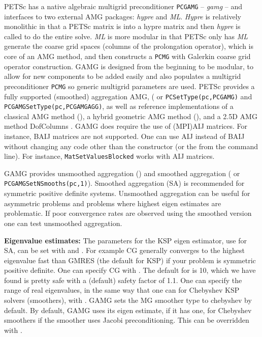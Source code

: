 PETSc has a native algebraic multigrid preconditioner \lstinline{PCGAMG} -- {\it gamg} -- and interfaces to two
external AMG packages: {\it hypre} and {\it ML}.
{\it Hypre}  is relatively monolithic in that a PETSc matrix is into a hypre matrix and then {\it hypre} is called to do the entire solve.
{\it ML} is more modular in that PETSc only has {\it ML} generate the coarse grid spaces (columns of the prolongation operator), which is core of an AMG method, and then constructs a \lstinline{PCMG} with Galerkin coarse grid operator construction.
GAMG is designed from the beginning to be modular, to allow for new components to be added easily and also populates a multigrid preconditioner \lstinline{PCMG} so generic multigrid parameters are used.
PETSc provides a fully supported (smoothed) aggregation AMG, ( or  \lstinline{PCSetType(pc,PCGAMG)} and \lstinline{PCGAMGSetType(pc,PCGAMGAGG)}, as well as reference implementations of a classical AMG method (), a hybrid geometric AMG method (), and a 2.5D AMG method DofColumns \cite{IsaacStadlerGhattas2015}.
GAMG does require the use of (MPI)AIJ matrices.
For instance, BAIJ matrices are not supported.
One can use AIJ instead of BAIJ without changing any code other than the constructor (or the  from the command line).
For instance, \lstinline{MatSetValuesBlocked} works with AIJ matrices.

GAMG provides unsmoothed aggregation () and smoothed aggregation ( or \lstinline{PCGAMGSetNSmooths(pc,1)}).
Smoothed aggregation (SA) is recommended for symmetric positive
definite systems.
Unsmoothed aggregation can be useful for asymmetric
problems and problems where highest eigen estimates are problematic.
If poor convergence rates are observed using the smoothed version one
can test unsmoothed aggregation.

{\bf Eigenvalue estimates:}
The parameters for the KSP eigen estimator, use for SA, can be set with  and .
For example CG generally converges to the highest eigenvalue fast than GMRES (the default
for KSP) if your problem is symmetric positive definite.
One can specify CG with .
The default for  is 10, which we have
found is pretty safe with a (default) safety factor of 1.1.
One can specify the range of real eigenvalues, in the same way that
one can for Chebyshev KSP solvers (smoothers), with
.
GAMG sets the MG smoother type to chebyshev by default.
By default, GAMG uses its eigen estimate, if it has one, for Chebyshev
smoothers if the smoother uses Jacobi preconditioning.
This can be overridden with .

